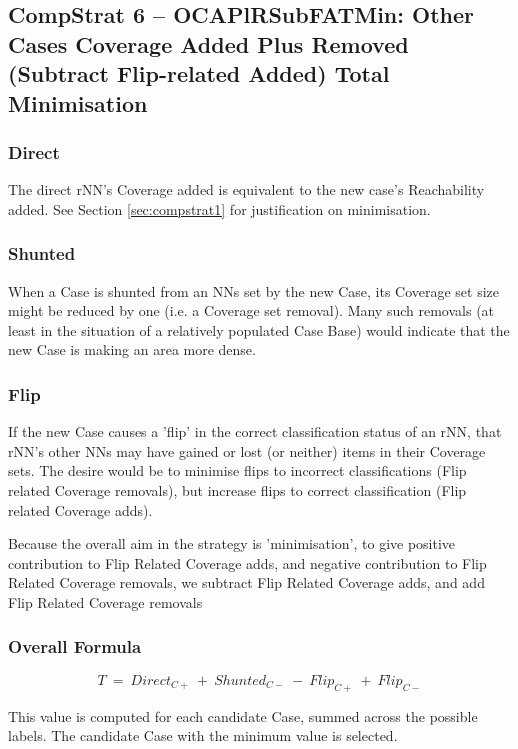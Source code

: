 \documentclass[a4paper,11pt]{report}
\begin{document}
\subsection{CompStrat 6 – OCAPlRSubFATMin: Other Cases Coverage Added Plus Removed (Subtract Flip-related Added) Total Minimisation}

\subsubsection{Direct}

The direct rNN's Coverage added is equivalent to the new case's Reachability added. See Section \ref{sec:compstrat1} for justification on minimisation.

\subsubsection{Shunted}

When a Case is shunted from an NNs set by the new Case, its Coverage set size might be reduced by one (i.e. a Coverage set removal). Many such removals (at least in the situation of a relatively populated Case Base) would indicate that the new Case is making an area more dense.

\subsubsection{Flip}

If the new Case causes a 'flip' in the correct classification status of an rNN, that rNN's other NNs may have gained or lost (or neither) items in their Coverage sets. The desire would be to minimise flips to incorrect classifications (Flip related Coverage removals), but increase flips to correct classification (Flip related Coverage adds).

Because the overall aim in the strategy is 'minimisation', to give positive contribution to Flip Related Coverage adds, and negative contribution to Flip Related Coverage removals, we subtract Flip Related Coverage adds, and add Flip Related Coverage removals

\subsubsection{Overall Formula}
\[  
  T~=~Direct_{C+}~+~Shunted_{C-}~-~Flip_{C+}~+~Flip_{C-}
\]

This value is computed for each candidate Case, summed across the possible labels. The candidate Case with the minimum value is selected.
\end{document}
